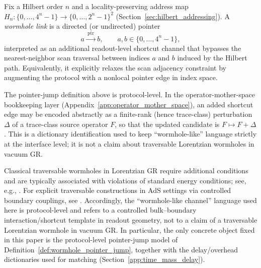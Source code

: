 \begin{definition}
\label{def:wormhole_pointer_jump}
Fix a Hilbert order $n$ and a locality-preserving address map $H_n:\{0,\dots,4^n-1\}\to\{0,\dots,2^n-1\}^2$ (Section~\ref{sec:hilbert_addressing}).
A \emph{wormhole link} is a directed (or undirected) pointer
\[
a \xrightarrow{\ \mathrm{ptr}\ } b,
\qquad
a,b\in\{0,\dots,4^n-1\},
\]
interpreted as an additional readout-level shortcut channel that bypasses the nearest-neighbor scan traversal between indices $a$ and $b$ induced by the Hilbert path.
Equivalently, it explicitly relaxes the scan adjacency constraint by augmenting the protocol with a nonlocal pointer edge in index space.
\end{definition}

\begin{remark}
\label{rem:wormhole_pointer_jump_operator_encoding}
\AuditTag The pointer-jump definition above is protocol-level.
In the operator-mother-space bookkeeping layer (Appendix~\ref{app:operator_mother_space}), an added shortcut edge may be encoded abstractly as a finite-rank (hence trace-class) perturbation $\Delta$ of a trace-class source operator $F$, so that the updated candidate is $F\mapsto F+\Delta$.
This is a dictionary identification used to keep ``wormhole-like'' language strictly at the interface level; it is not a claim about traversable Lorentzian wormholes in vacuum GR.
\end{remark}

\begin{remark}
Classical traversable wormholes in Lorentzian GR require additional conditions and are typically associated with violations of standard energy conditions; see, e.g., \cite{MorrisThorne1988,Visser1995}. For explicit traversable constructions in AdS settings via controlled boundary couplings, see \cite{GaoJafferisWall2017Traversable,MaldacenaStanfordYang2017Diving}.
Accordingly, the ``wormhole-like channel'' language used here is protocol-level and refers to a controlled bulk--boundary interaction/shortcut template in readout geometry, not to a claim of a traversable Lorentzian wormhole in vacuum GR.
In particular, the only concrete object fixed in this paper is the protocol-level pointer-jump model of Definition~\ref{def:wormhole_pointer_jump}, together with the delay/overhead dictionaries used for matching (Section~\ref{app:time_mass_delay}).
\end{remark}

